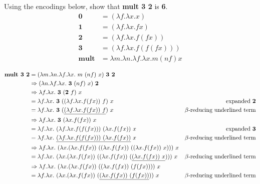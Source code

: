 \documentclass[addpoints]{exam}
\renewcommand{\L}[2]{\lambda #1.#2}
\begin{document}
\begin{questions}
  \newpage
  \question
  Using the encodings below, show that \textbf{mult 3 2} is \textbf{6}.
  \begin{align*}
    \textbf{0} & = (\L{f}{\L{x}{x}})\\
    \textbf{1} & = (\L{f}{\L{x}{f x}})\\
    \textbf{2} & = (\L{f}{\L{x}{f (f x)}})\\
    \textbf{3} & = (\L{f}{\L{x}{f (f (f x))}})\\
    \textbf{mult} & = \L{m}{\L{n}{\L{f}{\L{x}{m (n f) x}}}}
  \end{align*}

  \begin{solutionbox}{12cm}
  \begin{align*}
    \textbf{mult 3 2} &
     = (\L{m}{\L{n}{\L{f}{\L{x}{~m~(n f)~x}}}})~\textbf{3 2} & \\
    & \Rightarrow (\L{n}{\L{f}{\L{x}{~\textbf{3}~(n f)~x}}})~\textbf{2}\\
    & \Rightarrow \L{f}{\L{x}{~\textbf{3}~(\textbf{2}~f)~x}}\\
    & = \L{f}{\L{x}{~\textbf{3}~((\L{f}{\L{x}{f (f x)}})~f)~x}} & \textrm{expanded \textbf{2}}\\
    & = \L{f}{\L{x}{~\textbf{3}~(\underline{(\L{f}{\L{x}{f (f x)}})~f})~x}} & \textrm{$\beta$-reducing underlined term}\\
    & \Rightarrow \L{f}{\L{x}{~\textbf{3}~(\L{x}{f (f x)})~x}} & \\
    & = \L{f}{\L{x}{~(\L{f}{\L{x}{f (f (f x))}})~(\L{x}{f (f x)})~x}} & \textrm{expanded \textbf{3}}\\
    & = \L{f}{\L{x}{~\underline{(\L{f}{\L{x}{f (f (f x))}})~(\L{x}{f (f x)})}~x}} & \textrm{$\beta$-reducing underlined term}\\
    & \Rightarrow \L{f}{\L{x}{~(\L{x}{(\L{x}{f (f x)})~((\L{x}{f (f x)})~((\L{x}{f (f x)})~x))})~x}} & \\
    & = \L{f}{\L{x}{~(\L{x}{(\L{x}{f (f x)})~((\L{x}{f (f x)})~(\underline{(\L{x}{f (f x)})~x}))})~x}} & \textrm{$\beta$-reducing underlined term}\\
    & \Rightarrow \L{f}{\L{x}{~(\L{x}{(\L{x}{f (f x)})~((\L{x}{f (f x)})~(f (f x)))})~x}} & \\
    & = \L{f}{\L{x}{~(\L{x}{(\L{x}{f (f x)})~(\underline{(\L{x}{f (f x)})~(f (f x))})})~x}} & \textrm{$\beta$-reducing underlined term}\\

\end{align*}
\end{solutionbox}
\end{questions}
\end{document}
